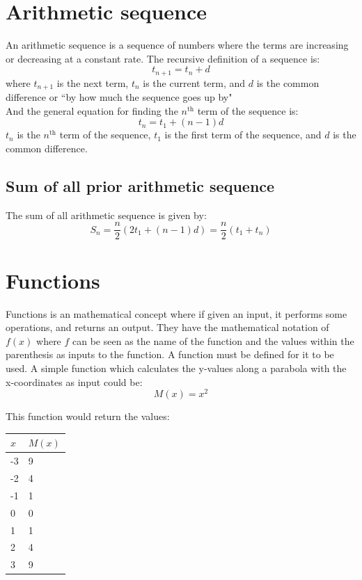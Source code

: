 \documentclass[a4paper,10pt]{report}
\begin{document}
\pagebreak

\section{Arithmetic sequence}
An arithmetic sequence is a sequence of numbers where the terms are increasing or decreasing at a constant rate.  The recursive definition of a sequence is:
$$t_{n + 1} = t_n + d$$
where $t_{n + 1}$ is the next term, $t_n$ is the current term, and $d$ is the common difference or ``by how much the sequence goes up by"\\

And the general equation for finding the $n^{\text{th}}$ term of the sequence is:
$$t_n = t_1 + (n - 1)d$$
$t_n$ is the $n^{\text{th}}$ term of the sequence, $t_1$ is the first term of the sequence, and $d$ is the common difference.

\subsection{Sum of all prior arithmetic sequence}
The sum of all arithmetic sequence is given by:
$$S_n = \frac{n}{2}(2t_1 + (n - 1)d) = \frac{n}{2}(t_1 + t_n)$$

\section{Functions}
Functions is an mathematical concept where if given an input, it performs some operations, and returns an output.  They have the mathematical notation of $f(x)$ where $f$ can be seen as the name of the function and the values within the parenthesis as inputs to the function.  A function must be defined for it to be used.  A simple function which calculates the y-values along a parabola with the x-coordinates as input could be:
$$M(x) = x^2$$

This function would return the values:
\begin{center}
	\begin{tabular}{l|l}
		$x$ & $M(x)$ \\ \hline
		-3  & 9      \\
		-2  & 4      \\
		-1  & 1      \\
		0   & 0      \\
		1   & 1      \\
		2   & 4      \\
		3   & 9
	\end{tabular}
\end{center}
\end{document}

